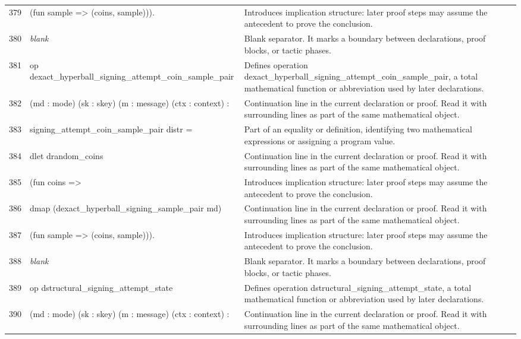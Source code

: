 \documentclass[10pt]{article}
\begin{document}
\begin{longtable}{r L{0.53\textwidth} L{0.37\textwidth}}
379 & {\ttfamily\scriptsize         (fun sample => (coins, sample))).} & Introduces implication structure: later proof steps may assume the antecedent to prove the conclusion. \\
380 & {\ttfamily\scriptsize \emph{blank}} & Blank separator.  It marks a boundary between declarations, proof blocks, or tactic phases. \\
381 & {\ttfamily\scriptsize op dexact\_hyperball\_signing\_attempt\_coin\_sample\_pair} & Defines operation dexact\_hyperball\_signing\_attempt\_coin\_sample\_pair, a total mathematical function or abbreviation used by later declarations. \\
382 & {\ttfamily\scriptsize    (md : mode) (sk : skey) (m : message) (ctx : context) :} & Continuation line in the current declaration or proof.  Read it with surrounding lines as part of the same mathematical object. \\
383 & {\ttfamily\scriptsize    signing\_attempt\_coin\_sample\_pair distr =} & Part of an equality or definition, identifying two mathematical expressions or assigning a program value. \\
384 & {\ttfamily\scriptsize   dlet drandom\_coins} & Continuation line in the current declaration or proof.  Read it with surrounding lines as part of the same mathematical object. \\
385 & {\ttfamily\scriptsize     (fun coins =>} & Introduces implication structure: later proof steps may assume the antecedent to prove the conclusion. \\
386 & {\ttfamily\scriptsize       dmap (dexact\_hyperball\_signing\_sample\_pair md)} & Continuation line in the current declaration or proof.  Read it with surrounding lines as part of the same mathematical object. \\
387 & {\ttfamily\scriptsize         (fun sample => (coins, sample))).} & Introduces implication structure: later proof steps may assume the antecedent to prove the conclusion. \\
388 & {\ttfamily\scriptsize \emph{blank}} & Blank separator.  It marks a boundary between declarations, proof blocks, or tactic phases. \\
389 & {\ttfamily\scriptsize op dstructural\_signing\_attempt\_state} & Defines operation dstructural\_signing\_attempt\_state, a total mathematical function or abbreviation used by later declarations. \\
390 & {\ttfamily\scriptsize    (md : mode) (sk : skey) (m : message) (ctx : context) :} & Continuation line in the current declaration or proof.  Read it with surrounding lines as part of the same mathematical object. \\

\end{longtable}
\end{document}
